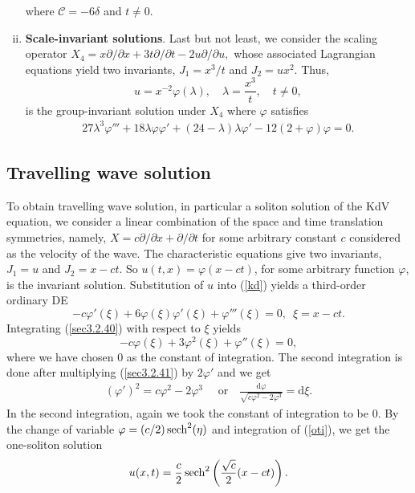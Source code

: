 \begin{enumerate}[(i)]
\begin{equation}
\end{equation}  where $ \mathcal{C}=-6\delta$ and $t \neq 0.$
\item \textbf{Scale-invariant solutions}.\newline
Last but not least, we consider the scaling operator $
X_4 = x \partial /\partial x + 3t \partial / \partial t -2u  \partial/ \partial u,$  whose associated Lagrangian equations yield two invariants, $J_1 = x^3/t$ and $J_2 = ux^2$. Thus, 
 \begin{equation} u = x^{-2}  \varphi(\lambda) , \quad \lambda=\frac{x^3}{t},  \label{ssol1} \quad  t \neq 0,
\end{equation} is the group-invariant solution under $X_4$ where  $\varphi$  satisfies  
\begin{eqnarray}\label{17}
27\lambda^3 \varphi'''	+18\lambda \varphi \varphi'+(24 - \lambda) \lambda \varphi' -12(2 + \varphi)\varphi =0.
\end{eqnarray}
\end{enumerate}
\subsection{Travelling wave solution} 
To obtain travelling wave solution, in particular a soliton solution of the KdV equation, we consider a linear combination of the space and time translation symmetries, namely,  $ X = c {\partial }/{\partial x} +  {\partial }/{\partial t}$ for some arbitrary constant $c$ considered as the velocity of the wave.
The characteristic equations give  two invariants, $ J_1 = u$ and $ J_2 = x -ct$.  So  $ u(t,x) = \varphi(x-ct)$, for some arbitrary function  $\varphi$,  is the invariant solution.
Substitution of $u$ into (\ref{kd}) yields a third-order ordinary DE 
\begin{equation} 
-c\varphi'(\xi)+ 6 \varphi (\xi)\varphi' (\xi)+ \varphi'''(\xi) = 0, \,\,\, \xi = x-ct. \label{sec3.2.40}
\end{equation}
Integrating  (\ref{sec3.2.40}) with respect to $\xi$ yields \begin{equation}  
-c\varphi (\xi)+ 3 \varphi^2 (\xi)+ \varphi''(\xi) = 0 \label{sec3.2.41}, 
\end{equation} 
where we have chosen  $0$ as the constant of integration. The second integration is done after multiplying  (\ref{sec3.2.41}) by $ 2 \varphi'$ and we get 
\begin{align} 
(\varphi')^2 = c \varphi^2- 2 \varphi^3 \quad  \text{ or}  \quad \frac{ \mathrm{d} \varphi}{ \sqrt{ c \varphi^2- 2 \varphi^3  } } = \mathrm{d} \xi. \label{oti}
\end{align} 
In the second integration, again we took the constant of integration to be $0$. By the change of variable $ \varphi =({c}/{2}) \operatorname{sech}^2( \eta)$ and integration of (\ref{oti}), we get the one-soliton solution 
\begin{equation}
u(x,t) = \frac{c}{2} \operatorname{sech}^2\left( \frac{ \sqrt{c}}{2}(x-ct)\right).
\end{equation}

